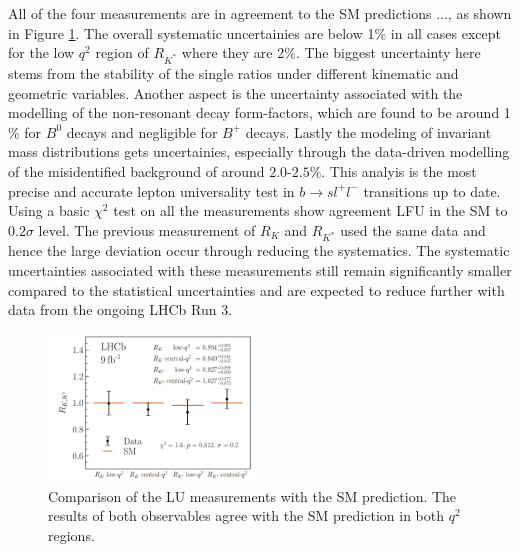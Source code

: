 \documentclass[%
 reprint,
 amsmath,amssymb,
 aps,
]{revtex4-2}
\begin{document}
All of the four measurements are in agreement to the SM predictions ..., as shown in Figure \ref{fig:5}. 
The overall systematic uncertainies are below 1$\%$ in all cases except for the low $q^2$ region of $R_{K^*}$ where they are 2$\%$.
The biggest uncertainty here stems from the stability of the single ratios under different kinematic and geometric variables. Another aspect
is the uncertainty associated with the modelling of the non-resonant decay form-factors, which are found to be around 1$\%$ for $B^0$ decays and negligible 
for $B^+$ decays. Lastly the modeling of invariant mass distributions gets uncertainies, especially through the data-driven modelling of the misidentified background
of around $2.0$-$2.5\%$.
This analyis is the most precise and accurate lepton universality test in $b \rightarrow s l^+ l^-$ transitions up to date. Using a basic $\chi^2$ test on all the measurements 
show agreement  LFU in the SM to $0.2\sigma$ level. The previous measurement of $R_K$ and $R_{K^*}$ used the same data and hence the large deviation occur 
through reducing the systematics. The systematic uncertainties associated
with these measurements still remain significantly smaller compared to the statistical uncertainties
and are expected to reduce further with data from the ongoing LHCb Run 3. 
\begin{figure}[h!]
    \centering
    \includegraphics[width=0.5\textwidth]{fit.png}
    \caption{Comparison of the LU measurements with the SM prediction. The results of
    both observables agree with the
    SM prediction in both $q^2$ regions.}
    \label{fig:5}
\end{figure}
 
\end{document}
